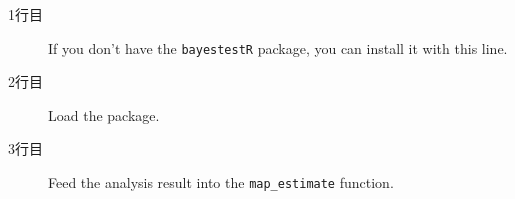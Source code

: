 \begin{description}
   \item[1行目] If you don't have the \texttt{bayestestR} package, you can install it with this line.
   \item[2行目] Load the package.
   \item[3行目] Feed the analysis result into the \verb|map_estimate| function.
\end{description}
